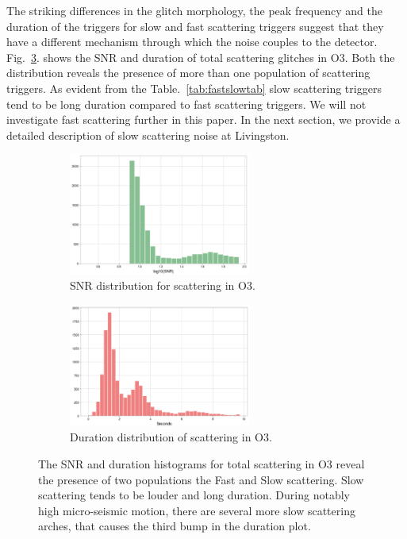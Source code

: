 \documentclass[12pt]{iopart}
\begin{document}
The striking differences in the glitch morphology, the peak frequency and the duration of the triggers for slow and fast scattering triggers suggest that they have a different mechanism through which the noise couples to the detector. Fig.~\ref{fig:snrdur}. shows the SNR and duration of total scattering glitches in O3. Both the distribution reveals the presence of more than one population of scattering triggers. As evident from the Table.~\ref{tab:fastslowtab} slow scattering triggers tend to be long duration compared to fast scattering triggers. We will not investigate fast scattering further in this paper. In the next section, we provide a detailed description of slow scattering noise at Livingston.
\begin{figure}[h]
   \centering
    \begin{subfigure}[b]{0.45\textwidth}
        \centering
         \includegraphics[width= 6cm]{histsnr2.png}
         \caption{SNR distribution for scattering in O3.}
         \label{fig:histsnr}
    \end{subfigure}
    \hfill
    \begin{subfigure}[b]{0.5\textwidth}
        \centering
         \includegraphics[width =6cm]{histdur2.png}
         \caption{{\small Duration distribution of scattering in O3.}}
         \label{fig:histdur}
         
    
    \end{subfigure}
    \caption{The SNR and duration histograms for total scattering in O3 reveal the presence of two populations the Fast and Slow scattering. Slow scattering tends to be louder and long duration. During notably high micro-seismic motion, there are several more slow scattering arches, that causes the third bump in the duration plot.}
    \label{fig:snrdur}
    
\end{figure}
\end{document}
